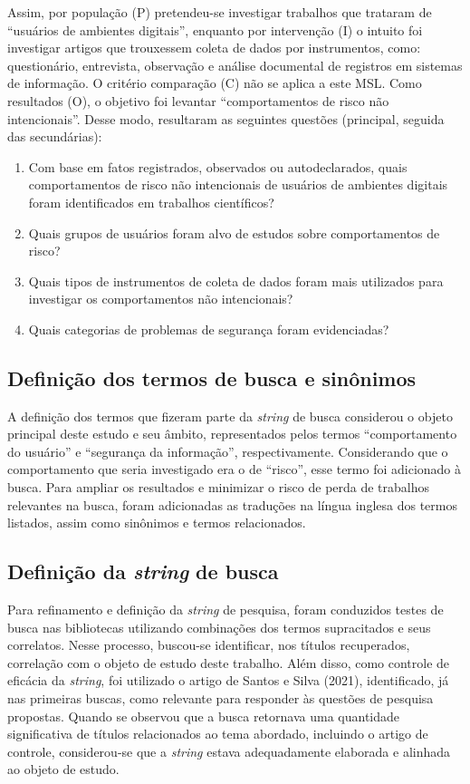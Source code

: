 \documentclass[portuguese]{textolivre}
\begin{document}
Assim, por população (P) pretendeu-se investigar trabalhos que trataram de “usuários de ambientes digitais”, enquanto por intervenção (I) o intuito foi investigar artigos que trouxessem coleta de dados por instrumentos, como: questionário, entrevista, observação e análise documental de registros em sistemas de informação. O critério comparação (C) não se aplica a este MSL. Como resultados (O), o objetivo foi levantar “comportamentos de risco não intencionais”. Desse modo, resultaram as seguintes questões (principal, seguida das secundárias):

\begin{enumerate}
    \item Com base em fatos registrados, observados ou autodeclarados, quais comportamentos de risco não intencionais de usuários de ambientes digitais foram identificados em trabalhos científicos?
    \item Quais grupos de usuários foram alvo de estudos sobre comportamentos de risco?
    \item Quais tipos de instrumentos de coleta de dados foram mais utilizados para investigar os comportamentos não intencionais?
    \item Quais categorias de problemas de segurança foram evidenciadas?
\end{enumerate}

\subsection{Definição dos termos de busca e sinônimos}\label{sec-formato}
A definição dos termos que fizeram parte da \textit{string} de busca considerou o objeto principal deste estudo e seu âmbito, representados pelos termos “comportamento do usuário” e “segurança da informação”, respectivamente. Considerando que o comportamento que seria investigado era o de “risco”, esse termo foi adicionado à busca. Para ampliar os resultados e minimizar o risco de perda de trabalhos relevantes na busca, foram adicionadas as traduções na língua inglesa dos termos listados, assim como sinônimos e termos relacionados.


\subsection{Definição da \textit{string} de busca}\label{sec-modelo}
Para refinamento e definição da \textit{string} de pesquisa, foram conduzidos testes de busca nas bibliotecas utilizando combinações dos termos supracitados e seus correlatos. Nesse processo, buscou-se identificar, nos títulos recuperados, correlação com o objeto de estudo deste trabalho. Além disso, como controle de eficácia da \textit{string}, foi utilizado o artigo de Santos e Silva (2021), identificado, já nas primeiras buscas, como relevante para responder às questões de pesquisa propostas. Quando se observou que a busca retornava uma quantidade significativa de títulos relacionados ao tema abordado, incluindo o artigo de controle, considerou-se que a \textit{string} estava adequadamente elaborada e alinhada ao objeto de estudo.
\end{document}
